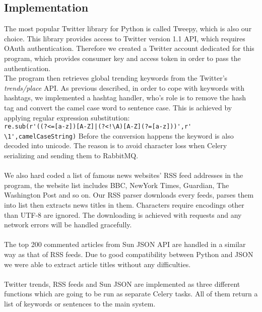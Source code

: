 \subsection{Implementation}
The most popular Twitter library for Python is called Tweepy, which is also 
our choice. This library provides access to Twitter version 1.1 API, which 
requires OAuth authentication. Therefore we created a Twitter account 
dedicated for this program, which provides consumer key and access token in 
order to pass the authentication. \\
The program then retrieves global trending keywords from the Twitter's {\em 
trends/place} API. As previous described, in order to cope with keywords with 
hashtags, we implemented a hashtag handler, who's role is to remove the hash 
tag and convert the camel case word to sentence case. This is achieved by 
applying regular expression substitution: \\
\newline
\verb`re.sub(r'((?<=[a-z])[A-Z]|(?<!\A)[A-Z](?=[a-z]))',r' \1',camelCaseString)`
\newline
Before the conversion happens the keyword is also decoded into unicode. The 
reason is to avoid character loss when Celery serializing and sending them to 
RabbitMQ. 
\paragraph{}
We also hard coded a list of famous news websites' RSS feed addresses in the 
program, the website list includes BBC, NewYork Times, Guardian, The Washington 
Post and so on. Our RSS parser downloads every feeds, parses them into list 
then extracts news titles in them. Characters require encodings other than 
UTF-8 are ignored. The downloading is achieved with requests and any network 
errors will be handled gracefully. 
\paragraph{}
The top 200 commented articles from Sun JSON API are handled in a similar way 
as that of RSS feeds. Due to good compatibility between Python and JSON we 
were able to extract article titles without any difficulties. 
\paragraph{}
Twitter trends, RSS feeds and Sun JSON are implemented as three different 
functions which are going to be run as separate Celery tasks. All of them 
return a list of keywords or sentences to the main system. 

